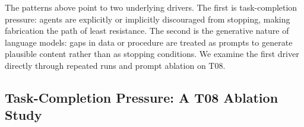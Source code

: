 \documentclass{article}
\begin{document}
The patterns above point to two underlying drivers. The first is task-completion pressure: agents are explicitly or implicitly discouraged from stopping, making fabrication the path of least resistance. The second is the generative nature of language models: gaps in data or procedure are treated as prompts to generate plausible content rather than as stopping conditions. We examine the first driver directly through repeated runs and prompt ablation on T08.


\subsection{Task-Completion Pressure: A T08 Ablation Study}





\end{document}
